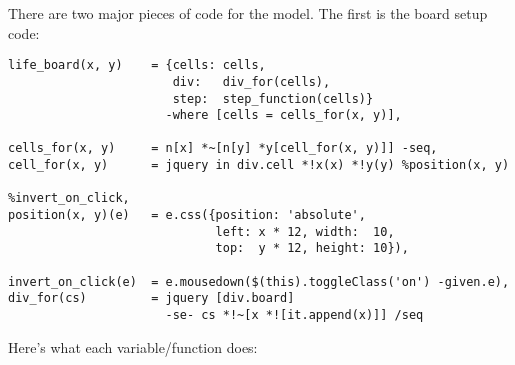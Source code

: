 \documentclass{report}
\begin{document}
      There are two major pieces of code for the model. The first is the board setup code:

\begin{verbatim}
life_board(x, y)    = {cells: cells,
                       div:   div_for(cells),
                       step:  step_function(cells)}
                      -where [cells = cells_for(x, y)],

cells_for(x, y)     = n[x] *~[n[y] *y[cell_for(x, y)]] -seq,
cell_for(x, y)      = jquery in div.cell *!x(x) *!y(y) %position(x, y)
                                                       %invert_on_click,
position(x, y)(e)   = e.css({position: 'absolute',
                             left: x * 12, width:  10,
                             top:  y * 12, height: 10}),

invert_on_click(e)  = e.mousedown($(this).toggleClass('on') -given.e),
div_for(cs)         = jquery [div.board]
                      -se- cs *!~[x *![it.append(x)]] /seq
\end{verbatim}

      Here's what each variable/function does:
\end{document}
